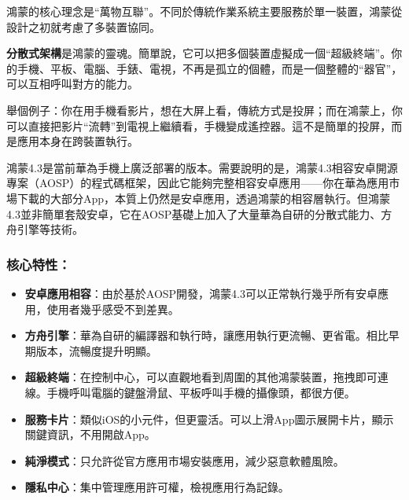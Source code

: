 


鴻蒙的核心理念是“萬物互聯”。不同於傳統作業系統主要服務於單一裝置，鴻蒙從設計之初就考慮了多裝置協同。

\textbf{分散式架構}是鴻蒙的靈魂。簡單說，它可以把多個裝置虛擬成一個“超級終端”。你的手機、平板、電腦、手錶、電視，不再是孤立的個體，而是一個整體的“器官”，可以互相呼叫對方的能力。

舉個例子：你在用手機看影片，想在大屏上看，傳統方式是投屏；而在鴻蒙上，你可以直接把影片“流轉”到電視上繼續看，手機變成遙控器。這不是簡單的投屏，而是應用本身在跨裝置執行。


鴻蒙4.3是當前華為手機上廣泛部署的版本。需要說明的是，鴻蒙4.3相容安卓開源專案（AOSP）的程式碼框架，因此它能夠完整相容安卓應用——你在華為應用市場下載的大部分App，本質上仍然是安卓應用，透過鴻蒙的相容層執行。但鴻蒙4.3並非簡單套殼安卓，它在AOSP基礎上加入了大量華為自研的分散式能力、方舟引擎等技術。

\subsubsection*{核心特性：}

\begin{itemize}
  \item \textbf{安卓應用相容}：由於基於AOSP開發，鴻蒙4.3可以正常執行幾乎所有安卓應用，使用者幾乎感受不到差異。
  \item \textbf{方舟引擎}：華為自研的編譯器和執行時，讓應用執行更流暢、更省電。相比早期版本，流暢度提升明顯。
  \item \textbf{超級終端}：在控制中心，可以直觀地看到周圍的其他鴻蒙裝置，拖拽即可連線。手機呼叫電腦的鍵盤滑鼠、平板呼叫手機的攝像頭，都很方便。
  \item \textbf{服務卡片}：類似iOS的小元件，但更靈活。可以上滑App圖示展開卡片，顯示關鍵資訊，不用開啟App。
  \item \textbf{純淨模式}：只允許從官方應用市場安裝應用，減少惡意軟體風險。
  \item \textbf{隱私中心}：集中管理應用許可權，檢視應用行為記錄。
\end{itemize}

